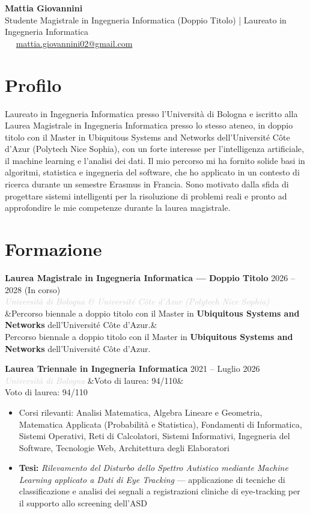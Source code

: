 \documentclass[a4paper,10pt]{article}
\newcommand{\entry}[4]{%
  \noindent\textbf{#1} \hfill \textcolor{accent}{#2}\\
  \textit{\textcolor{lightgray}{#3}}%
  \ifx&#4&\else\\\vspace{0.2em}#4\fi
  \vspace{0.5em}
}
\newcommand{\entrylist}[5]{%
  \noindent\textbf{#1} \hfill \textcolor{accent}{#2}\\
  \textit{\textcolor{lightgray}{#3}}%
  \ifx&#4&\else\\\vspace{0.2em}#4\fi
  \vspace{0.3em}
  \begin{itemize}#5\end{itemize}
  \vspace{0.3em}
}
\begin{document}
\begin{center}
  {\Huge\bfseries\color{darkgray} Mattia Giovannini}\\[0.4em]
  {\large\color{accent} Studente Magistrale in Ingegneria Informatica (Doppio Titolo) | Laureato in Ingegneria Informatica}\\[0.7em]
  \textcolor{lightgray}{
    \faPhone\ \PrivatePhone
    \quad\textbullet\quad
    \faEnvelope\ \href{mailto:mattia.giovannini02@gmail.com}{mattia.giovannini02@gmail.com}
  }
\end{center}

\vspace{0.5em}

\section{Profilo}

Laureato in Ingegneria Informatica presso l’Università di Bologna e iscritto alla Laurea Magistrale in Ingegneria Informatica presso lo stesso ateneo, in doppio titolo con il Master in Ubiquitous Systems and Networks dell'Université Côte d'Azur (Polytech Nice Sophia), con un forte interesse per l’intelligenza artificiale, il machine learning e l’analisi dei dati. Il mio percorso mi ha fornito solide basi in algoritmi, statistica e ingegneria del software, che ho applicato in un contesto di ricerca durante un semestre Erasmus in Francia. Sono motivato dalla sfida di progettare sistemi intelligenti per la risoluzione di problemi reali e pronto ad approfondire le mie competenze durante la laurea magistrale.

\section{Formazione}

\entry{Laurea Magistrale in Ingegneria Informatica — Doppio Titolo}{2026 -- 2028 (In corso)}{Università di Bologna \& Université Côte d'Azur (Polytech Nice Sophia)}
{Percorso biennale a doppio titolo con il Master in \textbf{Ubiquitous Systems and Networks} dell'Université Côte d'Azur.}

\entrylist{Laurea Triennale in Ingegneria Informatica}{2021 -- Luglio 2026}{Università di Bologna}{Voto di laurea: 94/110}{
  \item Corsi rilevanti: Analisi Matematica, Algebra Lineare e Geometria,
        Matematica Applicata (Probabilità e Statistica), Fondamenti di Informatica,
        Sistemi Operativi, Reti di Calcolatori, Sistemi Informativi,
        Ingegneria del Software, Tecnologie Web, Architettura degli Elaboratori
  \item \textbf{Tesi:} \textit{Rilevamento del Disturbo dello Spettro Autistico mediante Machine Learning applicato a Dati di Eye Tracking} — applicazione di tecniche di classificazione e analisi dei segnali a registrazioni cliniche di eye-tracking per il supporto allo screening dell’ASD
}
\end{document}
